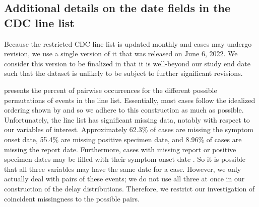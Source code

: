 \subsection{Additional details on the date fields in the CDC line list}
\label{supp:linelist-details}

Because the restricted CDC line list is updated monthly and cases may undergo revision, we
use a single version of it that was released on June 6, 2022. We consider this
version to be finalized in that it is well-beyond our study end date such that
the dataset is unlikely to be subject to further significant revisions.

 presents the percent of pairwise occurrences for
the different possible permutations of events in the line list. Essentially,
most cases follow the idealized ordering shown by
 and so we adhere to this construction as
much as possible. Unfortunately, the line list has significant missing data,
notably with respect to our variables of interest. Approximately 62.3\% of cases
are missing the symptom onset date, 55.4\% are missing positive specimen date,
and 8.96\% of cases are missing the report date. Furthermore, cases with missing
report or positive specimen dates may be filled with their symptom onset date
\citep{jahja2022real}. So it is possible that all three variables may have the
same date for a case. However, we only actually deal with pairs of these events;
we do not use all three at once in our construction of the delay distributions.
Therefore, we restrict our investigation of coincident missingness to the possible pairs.

